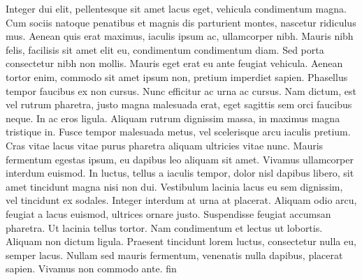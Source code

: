 \documentclass{article}
\newcounter{notes}
\newcommand{\notes}{\textbf{\thenotes}}
\begin{document}
{{ Integer dui elit, pellentesque sit amet lacus eget, vehicula condimentum magna. \notes
 Cum sociis natoque penatibus et magnis dis parturient montes, nascetur ridiculus mus. \notes
 Aenean quis erat maximus, iaculis ipsum ac, ullamcorper nibh. \notes
 Mauris nibh felis, facilisis sit amet elit eu, condimentum condimentum diam. \notes
 Sed porta consectetur nibh non mollis. \notes
 Mauris eget erat eu ante feugiat vehicula. \notes
 Aenean tortor enim, commodo sit amet ipsum non, pretium imperdiet sapien. \notes
 Phasellus tempor faucibus ex non cursus. \notes
 Nunc efficitur ac urna ac cursus. \notes
 Nam dictum, est vel rutrum pharetra, justo magna malesuada erat, eget sagittis sem orci faucibus neque. \notes
 In ac eros ligula. \notes
 Aliquam rutrum dignissim massa, in maximus magna tristique in. \notes
 Fusce tempor malesuada metus, vel scelerisque arcu iaculis pretium. \notes
 Cras vitae lacus vitae purus pharetra aliquam ultricies vitae nunc. \notes
 Mauris fermentum egestas ipsum, eu dapibus leo aliquam sit amet. \notes
 Vivamus ullamcorper interdum euismod. \notes
 In luctus, tellus a iaculis tempor, dolor nisl dapibus libero, sit amet tincidunt magna nisi non dui. \notes
 Vestibulum lacinia lacus eu sem dignissim, vel tincidunt ex sodales. \notes
 Integer interdum at urna at placerat. \notes
 Aliquam odio arcu, feugiat a lacus euismod, ultrices ornare justo. \notes
 Suspendisse feugiat accumsan pharetra. \notes
 Ut lacinia tellus tortor. \notes
 Nam condimentum et lectus ut lobortis. \notes
 Aliquam non dictum ligula. \notes
 Praesent tincidunt lorem luctus, consectetur nulla eu, semper lacus. \notes
 Nullam sed mauris fermentum, venenatis nulla dapibus, placerat sapien. \notes
 Vivamus non commodo ante. fin
}}

\pend
\endnumbering
\end{document}
